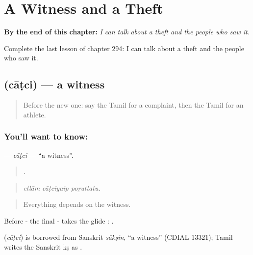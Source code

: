 
\chapter{A Witness and a Theft}
\label{ch:ta-a-witness-and-a-theft}

\begin{chapteropening}
\textbf{By the end of this chapter:} \emph{I can talk about a theft and the people who saw it.}

Complete the last lesson of chapter 294: I can talk about a theft and the people who saw it.
\end{chapteropening}

\section[\texorpdfstring{\ta{சாட்சி} (cāṭci)}{சாட்சி (cāṭci)}]{ (cāṭci) — a witness}

\label{lesson:TA-C294-catci}



\begin{quote}
Before the new one: say the Tamil for a complaint, then the Tamil for an athlete.
\end{quote}

\subsection*{You'll want to know: }
\textbf{} — \emph{cāṭci} — \textquotedblleft{}a witness\textquotedblright{}.

\begin{quote}
  .
\end{quote}

\begin{quote}
\emph{ellām cāṭciyaip poṟuttatu.}
\end{quote}

\begin{quote}
Everything depends on the witness.
\end{quote}

Before - the final - takes the glide : .

\begin{cousinweb}
\textbf{} (\emph{cāṭci}) is borrowed from Sanskrit \emph{sākṣin}, \textquotedblleft{}a witness\textquotedblright{} (CDIAL 13321); Tamil writes the Sanskrit kṣ as .
\end{cousinweb}

